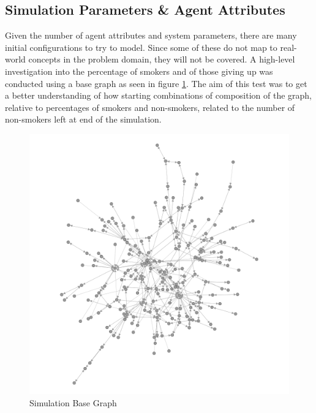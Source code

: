 \documentclass[]{report}
\begin{document}
\subsection{Simulation Parameters \& Agent Attributes}

Given the number of agent attributes and system parameters, there are many initial configurations to try to model. Since some of these do not map to real-world concepts in the problem domain, they will not be covered. A high-level investigation into the percentage of smokers and of those giving up was conducted using a base graph as seen in figure \ref{img:simbase}. The aim of this test was to get a better understanding of how starting combinations of composition of the graph, relative to percentages of smokers and non-smokers, related to the number of non-smokers left at end of the simulation. 


\begin{figure}
\label{img:simbase}
\begin{center}
\includegraphics[scale=0.4]{simbase.png}
\end{center}
\caption{Simulation Base Graph}
\end{figure}

\end{document}
